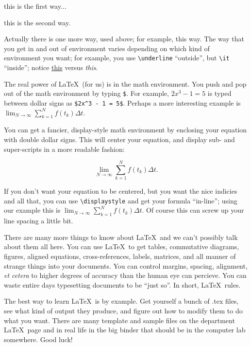 \documentclass{article}
\begin{document}
\centerline{this is the first way...}

\begin{center}
this is the second way.
\end{center}

\noindent Actually there is one more way, used above; for example, 
{\sc this way}.  The way that you get in and out of environment varies
depending on which kind of environment you want; for example, you use 
\verb|\underline| ``outside'', but \verb|\it| ``inside''; 
notice \underline{this} versus {\it this}.

The real power of \LaTeX\ (for us) is in the math environment. You 
push and pop out of the math environment by typing \verb|$|. For 
example, $2x^3 - 1 = 5$ is typed between dollar signs as
\verb|$2x^3 - 1 = 5$|. Perhaps a more interesting example is
$\lim_{N \to \infty} \sum_{k=1}^N f(t_k) \Delta t$.

You can get a fancier, display-style math 
environment by enclosing your equation with double dollar signs.  
This will center your equation, and display sub- and super-scripts in 
a more readable fashion:

$$\lim_{N \to \infty} \sum_{k=1}^N f(t_k) \Delta t.$$

If you don't want your equation to be centered, but you want the nice 
indicies and all that, you can use \verb|\displaystyle| and get your 
formula ``in-line''; using our example this is 
$\displaystyle \lim_{N \to \infty} \sum_{k=1}^N f(t_k) \Delta t.$  Of 
course this can screw up your line spacing a little bit.

There are many more things to know about \LaTeX\ and we can't 
possibly talk about them all here.
You can use \LaTeX\ to get tables, commutative diagrams, figures, 
aligned equations, cross-references, labels, matrices, and all manner 
of strange things into your documents.  You can control margins, 
spacing, alignment, {\it et cetera} to higher degrees of accuracy than 
the human eye can percieve.  You can waste entire days typesetting 
documents to be ``just so''.  In short, \LaTeX\ rules.

The best way to learn \LaTeX\ is by example. Get yourself a bunch
of .tex files, see what kind of output they produce, and figure out how
to modify them to do what you want.  There are many template and 
sample files on the department \LaTeX\ page and in real life in the 
big binder that should be in the computer lab somewhere.  Good luck!
\end{document}

